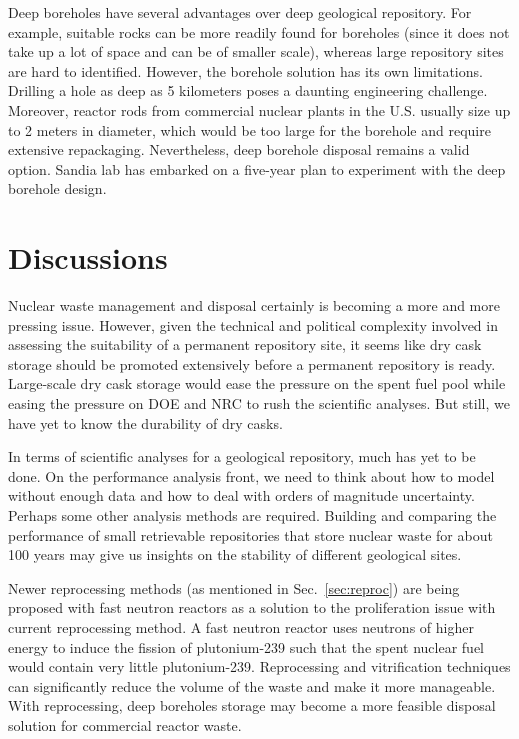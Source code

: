 \documentclass[nofootinbib,preprint,aps]{revtex4-1}
\begin{document}
        Deep boreholes have several advantages over deep geological repository. For example, suitable
        rocks can be more readily found for boreholes (since it does not take up a lot of space and can be
        of smaller scale),
        whereas large repository sites are hard to identified. \cite{b09,c15}
        However, the borehole solution has its own limitations.
        Drilling a hole as deep as 5 kilometers poses a daunting engineering challenge.
        Moreover, reactor rods from commercial nuclear plants in the U.S. usually size up to 2 meters in diameter,
        which would be too large for the borehole and require extensive repackaging.
        Nevertheless, deep borehole disposal remains a valid option.
        Sandia lab has embarked on a five-year plan to experiment with the deep borehole design.\cite{c15}


\section{Discussions}
Nuclear waste management and disposal certainly is becoming a more and more pressing issue.
However, given the technical and political complexity involved in assessing the suitability
of a permanent repository site,\cite{m14} it seems like dry cask storage should be promoted extensively
before a permanent repository is ready. Large-scale dry cask storage would ease the pressure on the
spent fuel pool while easing the pressure on DOE and NRC to rush the scientific analyses.
But still, we have yet to know the durability of dry casks.

In terms of scientific analyses for a geological repository, much has yet to be done.
On the performance analysis front, we need
to think about how to model without enough data and how to deal with orders of magnitude uncertainty.
Perhaps some other analysis methods are required. Building and comparing the performance of 
small retrievable repositories that store
nuclear waste for about 100 years may give us insights on the stability of different geological sites.

Newer reprocessing methods (as mentioned in Sec.~\ref{sec:reproc}) are being proposed with
fast neutron reactors as a solution to the proliferation issue with current reprocessing method.
A fast neutron reactor uses neutrons of higher energy to induce the fission of plutonium-239
such that the spent nuclear fuel would contain very little plutonium-239. Reprocessing and
vitrification techniques can significantly reduce the volume of the waste and make it more
manageable. With reprocessing, deep boreholes storage may become a more feasible disposal solution 
for commercial reactor waste.

\newpage


\end{document}
